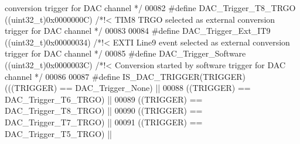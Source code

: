 \begin{DoxyCode}
{       conversion trigger for DAC channel */}
00082 \textcolor{preprocessor}{#}\textcolor{preprocessor}{define} \textcolor{preprocessor}{DAC\_Trigger\_T8\_TRGO}                \textcolor{preprocessor}{(}\textcolor{preprocessor}{(}\textcolor{preprocessor}{uint32\_t}\textcolor{preprocessor}{)}0x0000000C\textcolor{preprocessor}{)} \textcolor{comment}{/*!< TIM8 TRGO selected as external
       conversion trigger for DAC channel */}
00083 
00084 \textcolor{preprocessor}{#}\textcolor{preprocessor}{define} \textcolor{preprocessor}{DAC\_Trigger\_Ext\_IT9}                \textcolor{preprocessor}{(}\textcolor{preprocessor}{(}\textcolor{preprocessor}{uint32\_t}\textcolor{preprocessor}{)}0x00000034\textcolor{preprocessor}{)} \textcolor{comment}{/*!< EXTI Line9 event selected as
       external conversion trigger for DAC channel */}
00085 \textcolor{preprocessor}{#}\textcolor{preprocessor}{define} \textcolor{preprocessor}{DAC\_Trigger\_Software}               \textcolor{preprocessor}{(}\textcolor{preprocessor}{(}\textcolor{preprocessor}{uint32\_t}\textcolor{preprocessor}{)}0x0000003C\textcolor{preprocessor}{)} \textcolor{comment}{/*!< Conversion started by software
       trigger for DAC channel */}
00086 
00087 \textcolor{preprocessor}{#}\textcolor{preprocessor}{define} \textcolor{preprocessor}{IS\_DAC\_TRIGGER}\textcolor{preprocessor}{(}\textcolor{preprocessor}{TRIGGER}\textcolor{preprocessor}{)} \textcolor{preprocessor}{(}\textcolor{preprocessor}{(}\textcolor{preprocessor}{(}\textcolor{preprocessor}{TRIGGER}\textcolor{preprocessor}{)} \textcolor{preprocessor}{==} DAC_Trigger_None\textcolor{preprocessor}{)} \textcolor{preprocessor}{||}
00088                                  \textcolor{preprocessor}{(}\textcolor{preprocessor}{(}\textcolor{preprocessor}{TRIGGER}\textcolor{preprocessor}{)} \textcolor{preprocessor}{==} DAC_Trigger_T6_TRGO\textcolor{preprocessor}{)} \textcolor{preprocessor}{||}
00089                                  \textcolor{preprocessor}{(}\textcolor{preprocessor}{(}\textcolor{preprocessor}{TRIGGER}\textcolor{preprocessor}{)} \textcolor{preprocessor}{==} DAC_Trigger_T8_TRGO\textcolor{preprocessor}{)} \textcolor{preprocessor}{||}
00090                                  \textcolor{preprocessor}{(}\textcolor{preprocessor}{(}\textcolor{preprocessor}{TRIGGER}\textcolor{preprocessor}{)} \textcolor{preprocessor}{==} DAC_Trigger_T7_TRGO\textcolor{preprocessor}{)} \textcolor{preprocessor}{||}
00091                                  \textcolor{preprocessor}{(}\textcolor{preprocessor}{(}\textcolor{preprocessor}{TRIGGER}\textcolor{preprocessor}{)} \textcolor{preprocessor}{==} DAC_Trigger_T5_TRGO\textcolor{preprocessor}{)} \textcolor{preprocessor}{||}

\end{DoxyCode}
